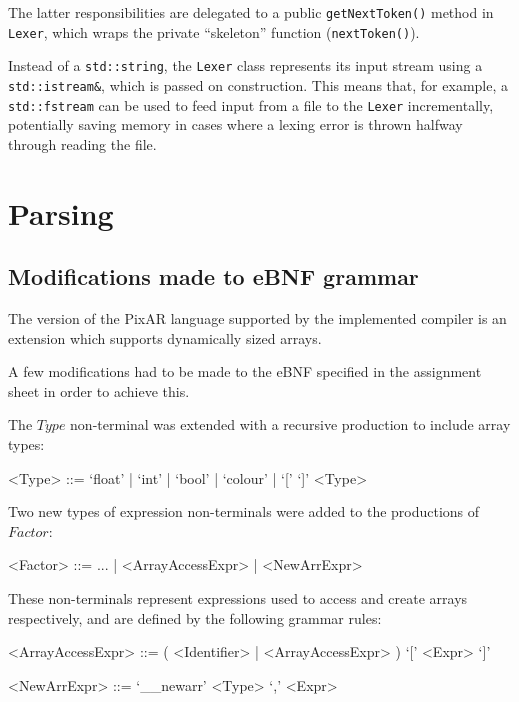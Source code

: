 \documentclass[11pt,a4paper]{scrartcl}
\begin{document}
The latter responsibilities are delegated to a public \verb|getNextToken()| method in \verb|Lexer|, which wraps the private ``skeleton'' function (\verb|nextToken()|).

Instead of a \verb|std::string|, the \verb|Lexer| class represents its input stream using a \verb|std::istream&|, which is passed on construction. This means that, for example, a \verb|std::fstream| can be used to feed input from a file to the \verb|Lexer| incrementally, potentially saving memory in cases where a lexing error is thrown halfway through reading the file.

\newpage

\section{Parsing}

\subsection{Modifications made to eBNF grammar}

The version of the PixAR language supported by the implemented compiler is an extension which supports dynamically sized arrays.

A few modifications had to be made to the eBNF specified in the assignment sheet in order to achieve this.

The $Type$ non-terminal was extended with a recursive production to include array types:
\begin{grammar}
  <Type> ::= `float' | `int' | `bool' | `colour' | `[' `]' <Type>
\end{grammar}

Two new types of expression non-terminals were added to the productions of $Factor$:
\begin{grammar}
  <Factor> ::= ... | <ArrayAccessExpr> | <NewArrExpr>
\end{grammar}

These non-terminals represent expressions used to access and create arrays respectively, and are defined by the following grammar rules:
\begin{grammar}
  <ArrayAccessExpr> ::= ( <Identifier> | <ArrayAccessExpr> ) `[' <Expr> `]'\\
\end{grammar}
\begin{grammar}
  <NewArrExpr> ::= `__newarr' <Type> `,' <Expr>
\end{grammar}
\end{document}
